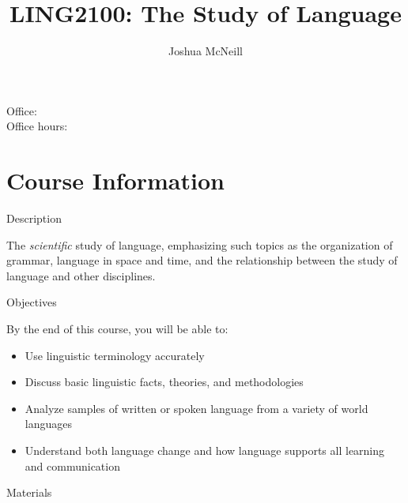 \documentclass{beamer}
\title[Welcome]{LING2100: The Study of Language}
\author{Joshua McNeill}
\institute{\url{joshua.mcneill@uga.edu}}
\date{}
\begin{document}
  \begin{frame}
    \titlepage
    \tiny{Office:\\
          Office hours:}
  \end{frame}

  \begin{frame}
    \tableofcontents[hideallsubsections]
  \end{frame}


  \section{Course Information}
    \begin{frame}{Description}
      \begin{block}{}
        The \emph{scientific} study of language, emphasizing such topics as the organization of grammar, language in space and time, and the relationship between the study of language and other disciplines.
      \end{block}
    \end{frame}

    \begin{frame}{Objectives}
      \begin{block}{}
        By the end of this course, you will be able to:
        \begin{itemize}
          \item Use linguistic terminology accurately
          \item Discuss basic linguistic facts, theories, and methodologies
          \item Analyze samples of written or spoken language from a variety of world languages
          \item Understand both language change and how language supports all learning and communication
        \end{itemize}
      \end{block}
    \end{frame}

    \begin{frame}{Materials}
      \begin{block}{}
      \end{block}
    \end{frame}
\end{document}
